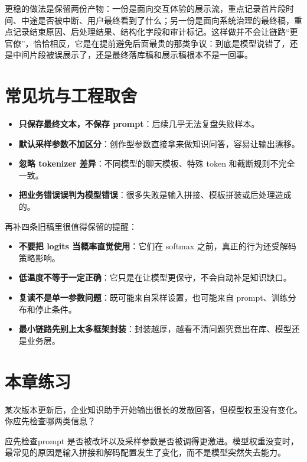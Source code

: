 更稳的做法是保留两份产物：一份是面向交互体验的展示流，重点记录首片段时间、中途是否被中断、用户最终看到了什么；另一份是面向系统治理的最终稿，重点记录结束原因、后处理结果、结构化字段和审计标记。这样做并不会让链路“更官僚”，恰恰相反，它是在提前避免后面最贵的那类争议：到底是模型说错了，还是中间片段被误展示了，还是最终落库稿和展示稿根本不是一回事。

\section{常见坑与工程取舍}
\begin{itemize}
  \item \textbf{只保存最终文本，不保存 prompt}：后续几乎无法复盘失败样本。
  \item \textbf{默认采样参数不加区分}：创作型参数直接拿来做知识问答，容易让输出漂移。
  \item \textbf{忽略 tokenizer 差异}：不同模型的聊天模板、特殊 token 和截断规则不完全一致。
  \item \textbf{把业务错误误判为模型错误}：很多失败是输入拼接、模板拼装或后处理造成的。
\end{itemize}

再补四条旧稿里很值得保留的提醒：
\begin{itemize}
  \item \textbf{不要把 logits 当概率直觉使用}：它们在 softmax 之前，真正的行为还受解码策略影响。
  \item \textbf{低温度不等于一定正确}：它只是在让模型更保守，不会自动补足知识缺口。
  \item \textbf{复读不是单一参数问题}：既可能来自采样设置，也可能来自 prompt、训练分布和停止条件。
  \item \textbf{最小链路先别上太多框架封装}：封装越厚，越看不清问题究竟出在库、模型还是业务层。
\end{itemize}

\section{本章练习}
\begin{exercise}[输出失控先看哪一层]
某次版本更新后，企业知识助手开始输出很长的发散回答，但模型权重没有变化。你应先检查哪两类信息？
\end{exercise}

\begin{solution}
应先检查{\heiti prompt 是否被改坏}以及{\heiti 采样参数是否被调得更激进}。模型权重没变时，最常见的原因是输入拼接和解码配置发生了变化，而不是模型突然失去能力。
\end{solution}

